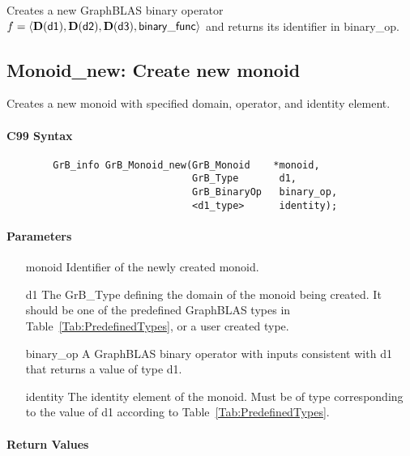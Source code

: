 Creates a new GraphBLAS binary operator $f = \langle \bold{D}({\sf d1}), 
\bold{D}({\sf d2}), \bold{D}({\sf d3}), {\sf binary\_func} \rangle$ and returns its identifier in {\sf binary\_op}.




\subsection{{\sf Monoid\_new}: Create new monoid}

Creates a new monoid with specified domain, operator, and identity element.

\paragraph{C99 Syntax}

\begin{verbatim}
        GrB_info GrB_Monoid_new(GrB_Monoid    *monoid,
                                GrB_Type       d1,
                                GrB_BinaryOp   binary_op,
                                <d1_type>      identity);
\end{verbatim}

\paragraph{Parameters}

\begin{itemize}[leftmargin=1.1in]
    \item[{\sf monoid}]         Identifier of the newly created monoid.
    \item[{\sf d1}]     The {\sf GrB\_Type} defining the domain of the monoid 
    being created. It should be one of the predefined GraphBLAS types in
    Table~\ref{Tab:PredefinedTypes}, or a user created type.
    \item[{\sf binary\_op}]     A GraphBLAS binary operator with inputs consistent
    with {\sf d1} that returns a value of type {\sf d1}.
    \item[{\sf identity}]       The identity element of the monoid. 
    Must be of type corresponding to the value of {\sf d1} according to
    Table~\ref{Tab:PredefinedTypes}.
\end{itemize}

\paragraph{Return Values}

